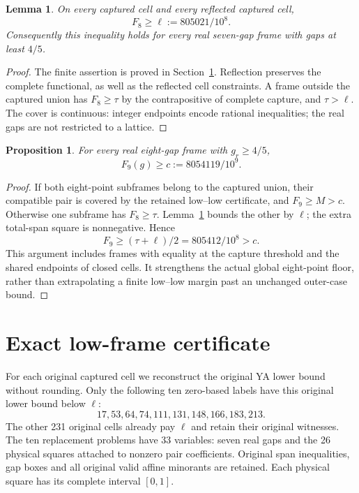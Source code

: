 \documentclass[11pt,a4paper]{article}
\newtheorem{lemma}[theorem]{Lemma}
\newtheorem{proposition}[theorem]{Proposition}
\begin{document}
\begin{lemma}\label{lem:floor}
On every captured cell and every reflected captured cell,
\[
 F_8\ge \ell:=805021/10^8.
\]
Consequently this inequality holds for every real seven-gap frame
with gaps at least $4/5$.
\end{lemma}
\begin{proof}
The finite assertion is proved in Section~\ref{sec:finite}.
Reflection preserves the complete functional, as well as the reflected
cell constraints. A frame outside the captured union has $F_8\ge\tau$
by the contrapositive of complete capture, and $\tau>\ell$.
The cover is continuous: integer endpoints encode rational inequalities;
the real gaps are not restricted to a lattice.
\end{proof}

\begin{proposition}\label{prop:local}
For every real eight-gap frame with $g_r\ge4/5$,
\[
 F_9(g)\ge c:=8054119/10^9.
\]
\end{proposition}
\begin{proof}
If both eight-point subframes belong to the captured union, their
compatible pair is covered by the retained low--low certificate, and
$F_9\ge M>c$. Otherwise one subframe has $F_8\ge\tau$.
Lemma~\ref{lem:floor} bounds the other by $\ell$; the extra total-span
square is nonnegative. Hence
\[
 F_9\ge(\tau+\ell)/2=805412/10^8>c.
\]
This argument includes frames with equality at the capture threshold
and the shared endpoints of closed cells. It strengthens the actual
global eight-point floor, rather than extrapolating a finite low--low
margin past an unchanged outer-case bound.
\end{proof}

\section{Exact low-frame certificate}\label{sec:finite}

For each original captured cell we reconstruct the original YA lower
bound without rounding. Only the following ten zero-based labels have
this original lower bound below $\ell$:
\[
 17,53,64,74,111,131,148,166,183,213.
\]
The other 231 original cells already pay $\ell$ and retain their
original witnesses. The ten replacement problems have 33 variables:
seven real gaps and the 26 physical squares attached to nonzero pair
coefficients. Original span inequalities, gap boxes and all original
valid affine minorants are retained. Each physical square has its
complete interval $[0,1]$.
\end{document}
